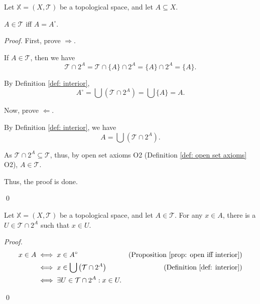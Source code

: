 \begin{proposition}
	\label{prop: open iff interior}
	Let $\mathbb X = (X, \mathcal T)$ be a topological space, and let $A \subseteq X$.
	
	$A \in \mathcal T$ iff $A = A^\circ$.
	
	\begin{proof}
		First, prove $\Rightarrow$.
		
		If $A \in \mathcal T$, then we have
		$$
		\mathcal T \cap 2^A = \mathcal T \cap \{A\} \cap 2^A = \{A\} \cap 2^A = \{A\}.
		$$
		
		By Definition \ref{def: interior},
		$$
		A^\circ = \bigcup(\mathcal T \cap 2^A) = \bigcup\{A\} = A.
		$$
		
		\qedlm
		
		Now, prove $\Leftarrow$.
		
		By Definition \ref{def: interior}, we have
		$$
		A = \bigcup(\mathcal T \cap 2^A).
		$$
		
		As $\mathcal T \cap 2^A \subseteq \mathcal T$, thus, by open set axioms O2 (Definition \ref{def: open set axioms} O2), $A \in \mathcal T$.
		
		\qedlm
		
		Thus, the proof is done.
		
		\qed
	\end{proof}
\end{proposition}


\begin{proposition}
	\label{prop: point in open set}
	Let $\mathbb X = (X, \mathcal T)$ be a topological space, and let $A \in \mathcal T$. For any $x \in A$, there is a $U \in \mathcal T \cap 2^A$ such that $x \in U$.
	
	\begin{proof}
		$$
		\begin{aligned}
			x \in A &\iff x \in A^\circ
				&\text{(Proposition \ref{prop: open iff interior})} \\
			&\iff x \in \bigcup\left( \mathcal T \cap 2^A \right)
				&\text{(Definition \ref{def: interior})} \\
			&\iff \exists U \in \mathcal T \cap 2^A: x \in U.
		\end{aligned}
		$$
		
		\qed
	\end{proof}
\end{proposition}


